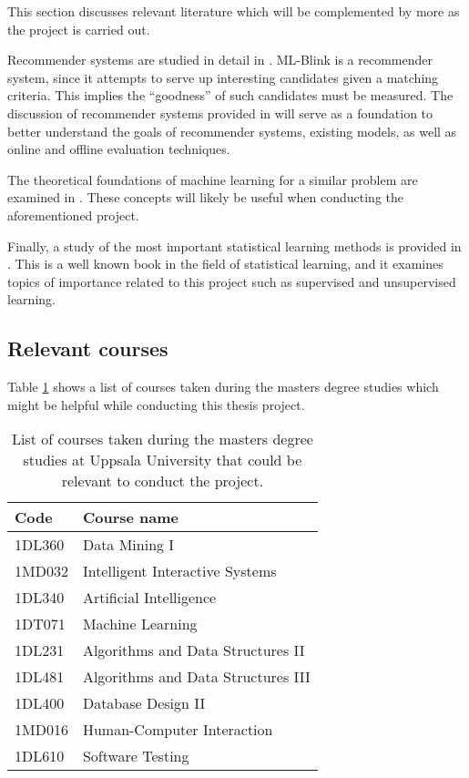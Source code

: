 This section discusses relevant literature which will be complemented by more as the project is carried out.

Recommender systems are studied in detail in \cite{BOOK:RST}. ML-Blink is a recommender system, since it attempts to serve up interesting candidates given a matching criteria. This implies the ``goodness'' of such candidates must be measured. The discussion of recommender systems provided in \cite{BOOK:RST} will serve as a foundation to better understand the goals of recommender systems, existing models, as well as online and offline evaluation techniques.

The theoretical foundations of machine learning for a similar problem are examined in \cite{article:fastlund}. These concepts will likely be useful when conducting the aforementioned project.

Finally, a study of the most important statistical learning methods is provided in \cite{BOOK:ESL}. This is a well known book in the field of statistical learning, and it examines topics of importance related to this project such as supervised and unsupervised learning.

\subsection{Relevant courses}
Table \ref{approach:relevant_courses} shows a list of courses taken during the masters degree studies which might be helpful while conducting this thesis project.

\begin{table}[ht]
  \centering
  \begin{tabularx}{\textwidth}{|l|X|}
    \hline
    Code & Course name \\
    \hline
    1DL360 & Data Mining I \\
    1MD032 & Intelligent Interactive Systems \\
    1DL340 & Artificial Intelligence \\
    1DT071 & Machine Learning \\
    1DL231 & Algorithms and Data Structures II \\
    1DL481 & Algorithms and Data Structures III \\
    1DL400 & Database Design II \\
    1MD016 & Human-Computer Interaction \\
    1DL610 & Software Testing \\
    \hline
  \end{tabularx}
  \caption{List of courses taken during the masters degree studies at Uppsala University that could be relevant to conduct the project.}
  \label{approach:relevant_courses}
\end{table}